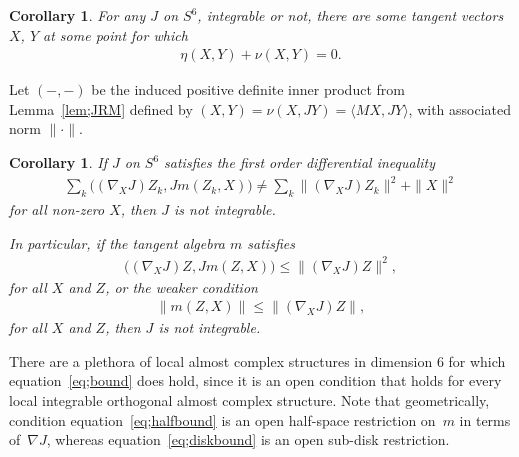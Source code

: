 \documentclass[pdftex]{sigma}
\newtheorem{cor}[thm]{Corollary}
\numberwithin{equation}{section}
\begin{document}
\begin{cor} For any $J$ on $S^{6}$, integrable or not, there are some tangent vectors $X$, $Y$ at some point for which
\begin{gather*}
 \eta(X,Y) + \nu( X , Y ) = 0.
\end{gather*}
\end{cor}

Let $( - , - )$ be the induced positive definite inner product from Lemma~\ref{lem;JRM} defined by $ ( X,Y) = \nu(X,JY) = \langle MX, JY \rangle$, with associated norm $\| \cdot \|$.

\begin{cor} \label{cor;bound}If $J$ on $S^6$ satisfies the first order differential inequality
\begin{gather} \label{eq;bound}
\sum_k \big( (\nabla_X J) Z_k, J m(Z_k,X) \big) \neq \sum_k \| (\nabla_X J) Z_k \|^2 + \|X\|^2
\end{gather}
for all non-zero $X$, then $J$ is not integrable.

In particular, if the tangent algebra $m$ satisfies
\begin{gather} \label{eq;halfbound}
\big( ( \nabla_X J ) Z, J m(Z,X) \big) \leq \| ( \nabla_X J ) Z \|^2 ,
\end{gather}
for all $X$ and $Z$, or the weaker condition
\begin{gather} \label{eq;diskbound}
\| m(Z,X) \| \leq \| (\nabla_X J) Z \|,
\end{gather}
for all $X$ and $Z$, then $J$ is not integrable.
\end{cor}

There are a plethora of local almost complex structures in dimension $6$ for which equation~\eqref{eq;bound} does hold, since it is an open condition that holds for every local integrable orthogonal almost complex structure. Note that geometrically, condition equation~\eqref{eq;halfbound} is an open half-space restriction on~$m$ in terms of~$\nabla J$, whereas equation~\eqref{eq;diskbound} is an open sub-disk restriction.
\end{document}
